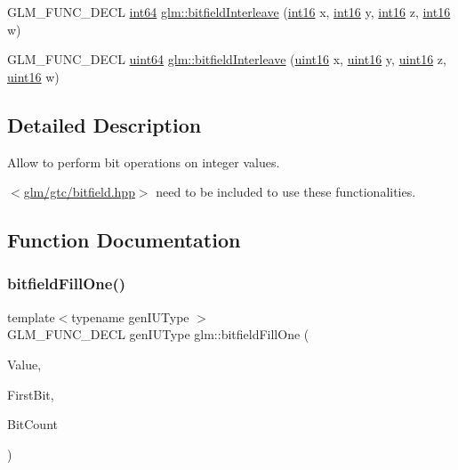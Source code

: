 \begin{DoxyCompactItemize}
\item 
G\+L\+M\+\_\+\+F\+U\+N\+C\+\_\+\+D\+E\+CL \hyperlink{group__gtc__type__precision_ga435d75819cce297cc5fa21bd84ef89a5}{int64} \hyperlink{group__gtc__bitfield_ga09ee0be0fac790a1607a711e597dd9bf}{glm\+::bitfield\+Interleave} (\hyperlink{group__gtc__type__precision_ga2945a61d12771f8954994fcddf02b021}{int16} x, \hyperlink{group__gtc__type__precision_ga2945a61d12771f8954994fcddf02b021}{int16} y, \hyperlink{group__gtc__type__precision_ga2945a61d12771f8954994fcddf02b021}{int16} z, \hyperlink{group__gtc__type__precision_ga2945a61d12771f8954994fcddf02b021}{int16} w)
\item 
G\+L\+M\+\_\+\+F\+U\+N\+C\+\_\+\+D\+E\+CL \hyperlink{group__gtc__type__precision_gae3632bf9b37da66233d78930dd06378a}{uint64} \hyperlink{group__gtc__bitfield_gac8a926a7bfd9b23c22a4f685193fbfe1}{glm\+::bitfield\+Interleave} (\hyperlink{group__gtc__type__precision_gad8c2939e1fdd8e5828b31d95c52255d5}{uint16} x, \hyperlink{group__gtc__type__precision_gad8c2939e1fdd8e5828b31d95c52255d5}{uint16} y, \hyperlink{group__gtc__type__precision_gad8c2939e1fdd8e5828b31d95c52255d5}{uint16} z, \hyperlink{group__gtc__type__precision_gad8c2939e1fdd8e5828b31d95c52255d5}{uint16} w)
\end{DoxyCompactItemize}


\subsection{Detailed Description}
Allow to perform bit operations on integer values. 

$<$\hyperlink{bitfield_8hpp}{glm/gtc/bitfield.\+hpp}$>$ need to be included to use these functionalities. 

\subsection{Function Documentation}
\mbox{\label{group__gtc__bitfield_ga46f9295abe3b5c7658f5b13c7f819f0a}} 
\subsubsection{\texorpdfstring{bitfield\+Fill\+One()}{bitfieldFillOne()}\hspace{0.1cm}{\footnotesize\ttfamily [1/2]}}
{\footnotesize\ttfamily template$<$typename gen\+I\+U\+Type $>$ \\
G\+L\+M\+\_\+\+F\+U\+N\+C\+\_\+\+D\+E\+CL gen\+I\+U\+Type glm\+::bitfield\+Fill\+One (\begin{DoxyParamCaption}\item[{gen\+I\+U\+Type}]{Value,  }\item[{int}]{First\+Bit,  }\item[{int}]{Bit\+Count }\end{DoxyParamCaption})}

